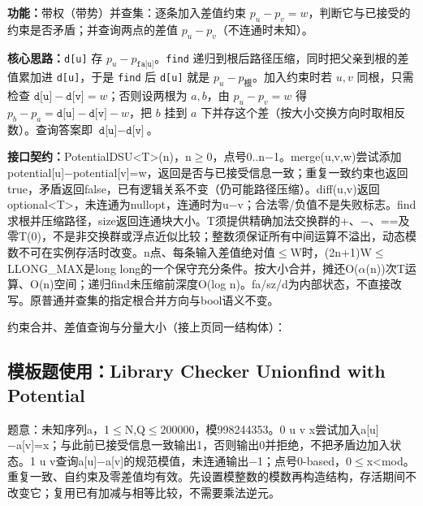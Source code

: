 \noindent\textbf{功能：}\allowbreak 带权（带势）并查集：逐条加入差值约束 $p_u-p_v=w$，判断它与已接受的约束是否矛盾；并查询两点的差值 $p_u-p_v$（不连通时未知）。

\textbf{核心思路：}\allowbreak \texttt{d[u]} 存 $p_u-p_{\texttt{fa[u]}}$。\texttt{find} 递归到根后路径压缩，同时把父亲到根的差值累加进 \texttt{d[u]}，于是 \texttt{find} 后 \texttt{d[u]} 就是 $p_u-p_{\text{根}}$。加入约束时若 $u,v$ 同根，只需检查 $\texttt{d[u]}-\texttt{d[v]}=w$；否则设两根为 $a,b$，由 $p_u-p_v=w$ 得 $p_b-p_a=\texttt{d[u]}-\texttt{d[v]}-w$，把 $b$ 挂到 $a$ 下并存这个差（按大小交换方向时取相反数）。查询答案即 $\texttt{d[u]}-\texttt{d[v]}$。



{\sloppy{}\noindent\textbf{接口契约：}PotentialDSU<T>(n)，n$\ge$0，点号0..n−1。merge(u,v,w)尝试添加potential[u]−potential[v]=w，返回是否与已接受信息一致；重复一致约束也返回true，矛盾返回false，已有逻辑关系不变（仍可能路径压缩）。diff(u,v)返回optional<T>，未连通为nullopt，连通时为u−v；合法零/负值不是失败标志。find求根并压缩路径，size返回连通块大小。T须提供精确加法交换群的+、−、==及零T(0)，不是非交换群或浮点近似比较；整数须保证所有中间运算不溢出，动态模数不可在实例存活时改变。n点、每条输入差值绝对值$\le$W时，(2n+1)W$\le$LLONG\_MAX是long long的一个保守充分条件。按大小合并，摊还O($\alpha$(n))次T运算、O(n)空间；递归find未压缩前深度O(log n)。fa/sz/d为内部状态，不直接改写。原普通并查集的指定根合并方向与bool语义不变。\par}

\Needspace{321pt}



\newpage

\noindent 约束合并、差值查询与分量大小（接上页同一结构体）：



\Needspace{491pt}

\subsection*{模板题使用：Library Checker Unionfind with Potential}

\label{usage-example-232}

题意：未知序列a，1$\le$N,Q$\le$200000，模998244353。0 u v x尝试加入a[u]−a[v]=x；与此前已接受信息一致输出1，否则输出0并拒绝，不把矛盾边加入状态。1 u v查询a[u]−a[v]的规范模值，未连通输出−1；点号0-based，0$\le$x<mod。重复一致、自约束及零差值均有效。先设置模整数的模数再构造结构，存活期间不改变它；复用已有加减与相等比较，不需要乘法逆元。

